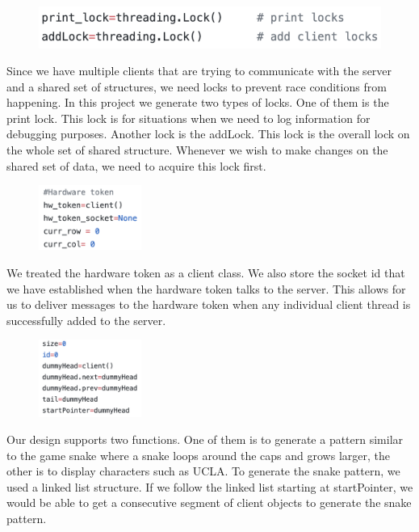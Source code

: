 \documentclass[a4paper,10pt]{article}
\begin{document}
\begin{figure}[H]
  \centering
      \includegraphics[width=\textwidth]{Assets/locks.png}
\end{figure}

Since we have multiple clients that are trying to communicate with the server and a shared set of structures, we need locks to prevent race conditions from happening. In this project we generate two types of locks. One of them is the print lock. This lock is for situations when we need to log information for debugging purposes. Another lock is the addLock. This lock is the overall lock on the whole set of shared structure. Whenever we wish to make changes on the shared set of data, we need to acquire this lock first.

\begin{figure}[H]
  \centering
      \includegraphics[width=0.3\textwidth]{Assets/token_python.png}
\end{figure}

We treated the hardware token as a client class. We also store the socket id that we have established when the hardware token talks to the server. This allows for us to deliver messages to the hardware token when any individual client thread is successfully added to the server.

\begin{figure}[H]
  \centering
      \includegraphics[width=0.3\textwidth]{Assets/snake_params.png}
\end{figure}

Our design supports two functions. One of them is to generate a pattern similar to the game snake where a snake loops around the caps and grows larger, the other is to display characters such as UCLA. To generate the snake pattern, we used a linked list structure. If we follow the linked list starting at startPointer, we would be able to get a consecutive segment of client objects to generate the snake pattern.
\end{document}
